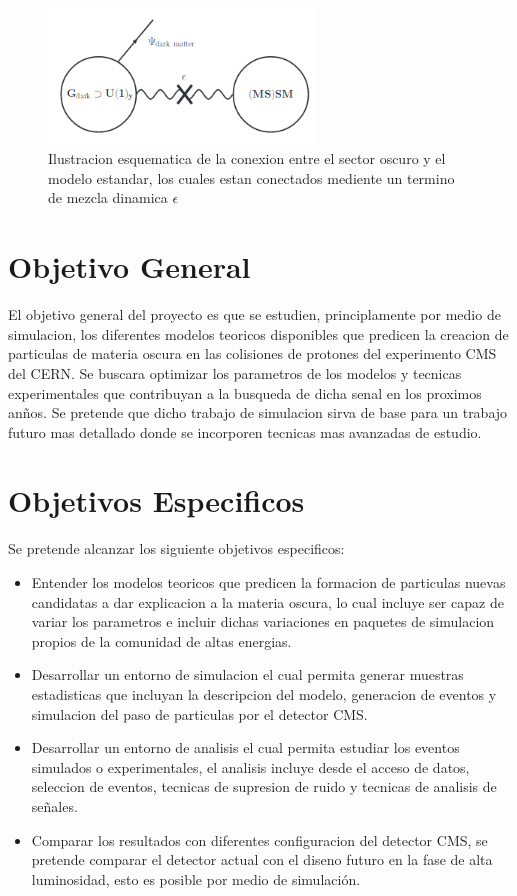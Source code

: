 \begin{figure}
\begin{center}
  \includegraphics[width=2.8in]{sketch_darksector.png}
  \caption{Ilustracion esquematica de la conexion entre el sector oscuro y el modelo estandar, los cuales estan conectados mediente un termino de mezcla dinamica $\epsilon$}
  \label{fig:AMS_positron}
\end{center}
\end{figure}


\chapter{Objetivo General}

El objetivo general del proyecto es que se estudien, principlamente por medio de simulacion, los diferentes modelos teoricos disponibles que predicen la creacion de particulas de materia oscura en las colisiones de protones del experimento CMS del CERN.  Se buscara optimizar los parametros de los modelos y tecnicas experimentales que contribuyan a la busqueda de dicha senal en los proximos an\~nos.   Se pretende que dicho trabajo de simulacion sirva de base para un trabajo futuro mas detallado donde se incorporen tecnicas mas avanzadas de estudio. 


\chapter{Objetivos Especificos}

Se pretende alcanzar los siguiente objetivos especificos: 

\begin{itemize}
\item Entender los modelos teoricos que predicen la formacion de particulas nuevas candidatas a dar explicacion a la materia oscura, lo cual incluye ser capaz de variar los parametros e incluir dichas variaciones en paquetes de simulacion propios de la comunidad de altas energias. 
\item Desarrollar un entorno de simulacion el cual permita generar muestras estadisticas que incluyan la descripcion del modelo, generacion de eventos y simulacion del paso de particulas por el detector CMS. 
 \item Desarrollar un entorno de analisis el cual permita estudiar los eventos simulados o experimentales, el analisis incluye desde el acceso de datos, seleccion de eventos, tecnicas de supresion de ruido y tecnicas de analisis de se\~nales. 
\item Comparar los resultados con diferentes configuracion del detector CMS, se pretende comparar el detector actual con el diseno futuro en la fase de alta luminosidad, esto es posible por medio de simulaci\'on. 
  
\end{itemize}


